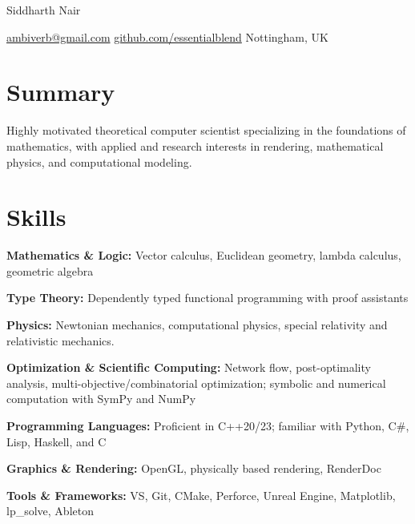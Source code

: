 \documentclass[11pt,a4paper]{article}
\begin{document}
{\fontsize{24}{28}\selectfont\centering Siddharth Nair\par}
\vspace{10pt}

{\fontsize{10}{12}\selectfont\centering
\href{mailto:ambiverb@gmail.com}{ambiverb@gmail.com}  \quad
\href{https://github.com/essentialblend}{github.com/essentialblend} \quad
Nottingham, UK\par}
\vspace{10pt}

\section{Summary}
\vspace{1pt}
\noindent Highly motivated theoretical computer scientist specializing in the foundations of mathematics, with applied and research interests in rendering, mathematical physics, and computational modeling.

\section{Skills}
\vspace{1pt}

\noindent \textbf{Mathematics \& Logic:} Vector calculus, Euclidean geometry, lambda calculus, geometric algebra
\vspace{4pt}

\noindent \textbf{Type Theory:} Dependently typed functional programming with proof assistants
\vspace{4pt}

\noindent \textbf{Physics:} Newtonian mechanics, computational physics, special relativity and relativistic mechanics.
\vspace{4pt}

\noindent \textbf{Optimization \& Scientific Computing:} Network flow, post-optimality analysis, multi-objective/combinatorial optimization; symbolic and numerical computation with SymPy and NumPy
\vspace{4pt}

\noindent \textbf{Programming Languages:} Proficient in C++20/23; familiar with Python, C\#, Lisp, Haskell, and C
\vspace{4pt}

\noindent \textbf{Graphics \& Rendering:} OpenGL, physically based rendering, RenderDoc
\vspace{4pt}

\noindent \textbf{Tools \& Frameworks:} VS, Git, CMake, Perforce, Unreal Engine, Matplotlib, lp\_solve, Ableton
\vspace{4pt}
\end{document}
